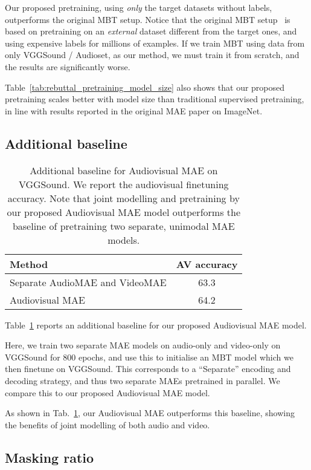 \documentclass[10pt,twocolumn,letterpaper]{article}
\begin{document}
Our proposed pretraining, using \textit{only} the target datasets without labels, outperforms the original MBT setup. Notice that the original MBT setup~\cite{nagrani2021attention} is based on pretraining on an \textit{external} dataset different from the target ones, and using expensive labels for millions of examples.
If we train MBT using data from only VGGSound / Audioset, as our method, we must train it from scratch, and the results are significantly worse. 

Table~\ref{tab:rebuttal_pretraining_model_size} also shows that our proposed pretraining scales better with model size than traditional supervised pretraining, in line with results reported in the original MAE paper \cite{he2022masked} on ImageNet.



\subsection{Additional baseline}

\begin{table}[t]
	\caption{
	Additional baseline for Audiovisual MAE on VGGSound. We report the audiovisual finetuning accuracy.
	Note that joint modelling and pretraining by our proposed Audiovisual MAE model outperforms the baseline of pretraining two separate, unimodal MAE models.
	}
	\begin{tabular}{lc}
	\toprule
	Method & AV accuracy \\
	\midrule
	 Separate AudioMAE and VideoMAE & 63.3 \\  Audiovisual MAE & 64.2 \\ \bottomrule
	\end{tabular}
	\label{tab:additional_baseline}
\end{table} 
Table~\ref{tab:additional_baseline} reports an additional baseline for our proposed Audiovisual MAE model.

Here, we train two separate MAE models on audio-only and video-only on VGGSound for 800 epochs, and use this to initialise an MBT model which we then finetune on VGGSound.
This corresponds to a ``Separate'' encoding and decoding strategy, and thus two separate MAEs pretrained in parallel.
We compare this to our proposed Audiovisual MAE model.

As shown in Tab.~\ref{tab:additional_baseline}, our Audiovisual MAE outperforms this baseline, showing the benefits of joint modelling of both audio and video.


\subsection{Masking ratio}
\end{document}
